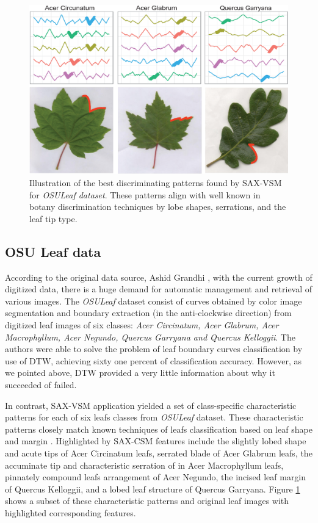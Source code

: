 \documentclass{llncs}
\newcommand{\myfigureshrinker}{\vspace{-1cm}}
\begin{document}
\begin{figure}[t]
   \myfigureshrinker
   \centering
   \includegraphics[width=115mm]{figures/AcerCircunatum.eps}
   \caption{Illustration of the best discriminating patterns found by SAX-VSM for
\textit{OSULeaf dataset}. These patterns align with well known in botany discrimination techniques
by lobe shapes, serrations, and the leaf tip type.}
   \label{fig:shapelet-acer-patterns}
\end{figure}

\subsection{OSU Leaf data}
According to the original data source, Ashid Grandhi \cite{osuleaf}, with the current growth of
digitized data, there is a huge demand for automatic management and retrieval of various images. The
\textit{OSULeaf} dataset consist of curves obtained by color image segmentation and boundary
extraction (in the anti-clockwise direction) from digitized leaf images of six classes: \textit{Acer
Circinatum, Acer Glabrum, Acer Macrophyllum, Acer Negundo, Quercus Garryana and Quercus Kelloggii}.
The authors were able to solve the problem of leaf boundary curves classification by use of DTW, 
achieving sixty one percent of classification accuracy. However, as we pointed above, DTW provided a
very little information about why it succeeded of failed. 

In contrast, SAX-VSM application yielded a set of class-specific characteristic patterns for each of
six leafs classes from \textit{OSULeaf} dataset. These characteristic patterns closely match
known techniques of leafs classification based on leaf shape and margin \cite{dirr}. 
Highlighted by SAX-CSM features include the slightly lobed shape and acute tips of
Acer Circinatum leafs, serrated blade of Acer Glabrum leafs, the accuminate tip and characteristic
serration of in Acer Macrophyllum leafs, pinnately compound leafs arrangement of Acer Negundo, the
incised leaf margin of Quercus Kelloggii, and a lobed leaf structure of Quercus Garryana. 
Figure \ref{fig:shapelet-acer-patterns} shows a subset of these characteristic patterns and original
leaf images with highlighted corresponding features.
\end{document}
